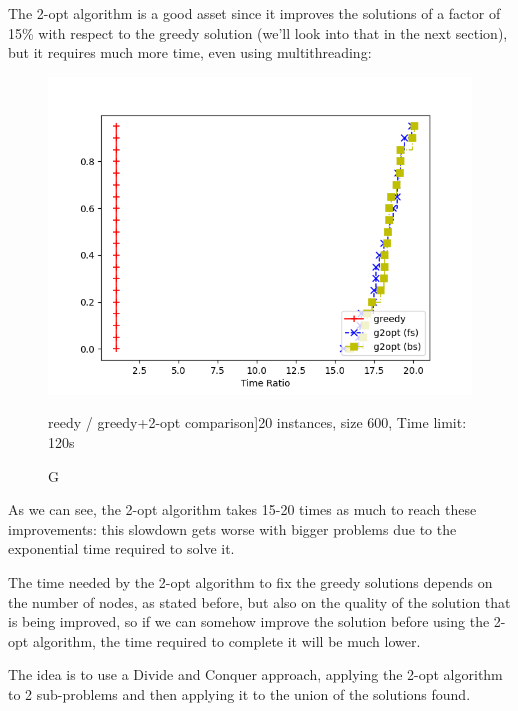 The 2-opt algorithm is a good asset since it improves the solutions of a factor of 15\% with respect to the greedy solution (we'll look into that in the next section), but it requires much more time, even using multithreading:
\begin{figure}[h]
    \centering
    \includegraphics*[width=.6\textwidth]{../plots/perfprof_g2opt_times.png}
    \caption*Greedy / greedy+2-opt comparison]{20 instances, size 600, Time limit: 120s}
\end{figure}

As we can see, the 2-opt algorithm takes 15-20 times as much to reach these improvements: this slowdown gets worse with bigger problems due to the exponential time required to solve it.

The time needed by the 2-opt algorithm to fix the greedy solutions depends on the number of nodes, as stated before, but also on the quality of the solution that is being improved, so if we can somehow improve the solution before using the 2-opt algorithm, the time required to complete it will be much lower.

The idea is to use a Divide and Conquer approach, applying the 2-opt algorithm to 2 sub-problems and then applying it to the union of the solutions found.

